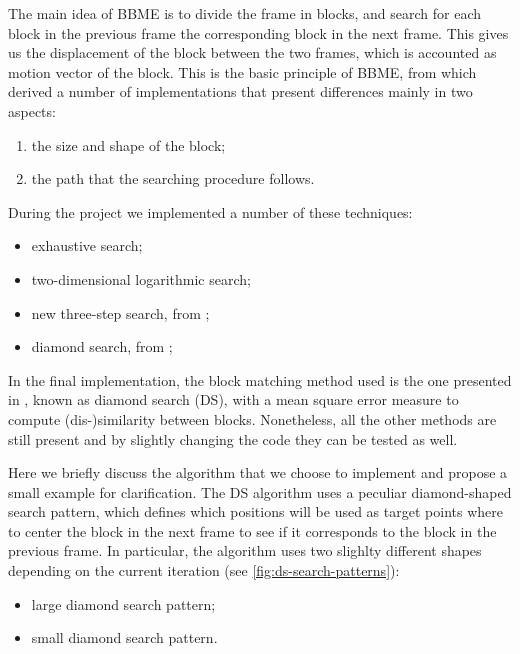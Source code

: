 The main idea of BBME is to divide the frame in blocks, and search for each block in the previous frame the corresponding block in the next frame.
This gives us the displacement of the block between the two frames, which is accounted as motion vector of the block.
This is the basic principle of BBME, from which derived a number of implementations that present differences mainly in two aspects:
\begin{enumerate}
    \item the size and shape of the block;
    \item the path that the searching procedure follows.
\end{enumerate}

During the project we implemented a number of these techniques:
\begin{itemize}
    \item exhaustive search;
    \item two-dimensional logarithmic search;
    \item new three-step search, from \cite{Li94};
    \item diamond search, from \cite{Zhu2000};
\end{itemize}

In the final implementation, the block matching method used is the one presented in \cite{Zhu2000}, known as diamond search (DS),  with a mean square error measure to compute (dis-)similarity between blocks.
Nonetheless, all the other methods are still present and by slightly changing the code they can be tested as well.

Here we briefly discuss the algorithm that we choose to implement and propose a small example for clarification.
The DS algorithm uses a peculiar diamond-shaped search pattern, which defines which positions will be used as target points where to center the block in the next frame to see if it corresponds to the block in the previous frame. In particular, the algorithm uses two slighlty different shapes depending on the current iteration (see \cref*{fig:ds-search-patterns}):
\begin{itemize}
    \item large diamond search pattern;
    \item small diamond search pattern.
\end{itemize}

